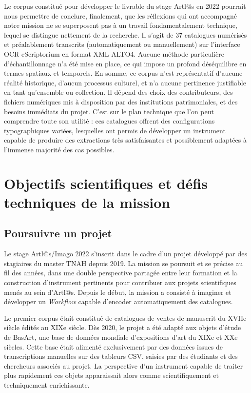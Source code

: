 \documentclass[a4paper,12pt,twoside]{book}
\begin{document}
Le corpus constitué pour développer le livrable du stage Artl@s en 2022 pourrait nous permettre de conclure, finalement, que les réflexions qui ont accompagné notre mission ne se superposent pas à un travail fondamentalement technique, lequel se distingue nettement de la recherche. Il s'agit de 37 catalogues numérisés et préalablement transcrits (automatiquement ou manuellement) sur l'interface OCR eScriptorium en format XML ALTO4. Aucune méthode particulière d'échantillonnage n'a été mise en place, ce qui impose un profond déséquilibre en termes spatiaux et temporels. En somme, ce corpus n'est représentatif d'aucune réalité historique, d'aucun processus culturel, et n'a aucune pertinence justifiable en tant qu'ensemble ou collection. Il dépend des choix des contributeurs, des fichiers numériques mis à disposition par des institutions patrimoniales, et des besoins immédiats du projet. C'est sur le plan technique que l'on peut comprendre toute son utilité : ces catalogues offrent des configurations typographiques variées, lesquelles ont permis de développer un instrument capable de produire des extractions très satisfaisantes et possiblement adaptées à l'immense majorité des cas possibles.  


\part{Objectifs scientifiques et défis techniques de la mission}
	\chapter{Poursuivre un projet}
	
Le stage Artl@s/Imago 2022 s'inscrit dans le cadre d'un projet développé par des stagiaires du master TNAH depuis 2019. La mission se poursuit et se précise au fil des années, dans une double perspective partagée entre leur formation et la construction d'instrument pertinents pour contribuer aux projets scientifiques menés au sein d'Artl@s. Depuis le début, la mission a consisté à imaginer et développer un \textit{Workflow} capable d'encoder automatiquement des catalogues.

Le premier corpus était constitué de catalogues de ventes de manuscrit du XVIIe siècle édités au XIXe siècle. Dès 2020, le projet a été adapté aux objets d'étude de BasArt, une base de données mondiale d'expositions d'art du XIXe et XXe siècles. Cette base était alimenté exclusivement par des données issues de transcriptions manuelles sur des tableurs CSV, saisies par des étudiants et des chercheurs associés au projet. La perspective d'un instrument capable de traiter plus rapidement ces objets apparaissait alors comme scientifiquement et techniquement enrichissante. 
\end{document}
